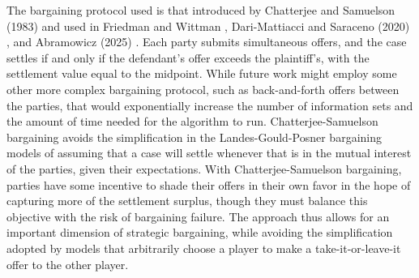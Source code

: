 \documentclass{article}
\begin{document}
The bargaining protocol used is that introduced by Chatterjee and Samuelson (1983) \cite{chatterjeesamuelson} and used in Friedman and Wittman \cite{friedmanwittman}, Dari-Mattiacci and Saraceno (2020) \cite{darimatiaccisaraceno}, and Abramowicz (2025) \cite{abramowicz}. Each party submits simultaneous offers, and the case settles if and only if the defendant's offer exceeds the plaintiff's, with the settlement value equal to the midpoint. While future work might employ some other more complex bargaining protocol, such as back-and-forth offers between the parties, that would exponentially increase the number of information sets and the amount of time needed for the algorithm to run. Chatterjee-Samuelson bargaining avoids the simplification in the Landes-Gould-Posner bargaining models of assuming that a case will settle whenever that is in the mutual interest of the parties, given their expectations. With Chatterjee-Samuelson bargaining, parties have some incentive to shade their offers in their own favor in the hope of capturing more of the settlement surplus, though they must balance this objective with the risk of bargaining failure. The approach thus allows for an important dimension of strategic bargaining, while avoiding the simplification adopted by models that arbitrarily choose a player to make a take-it-or-leave-it offer to the other player.
\end{document}

